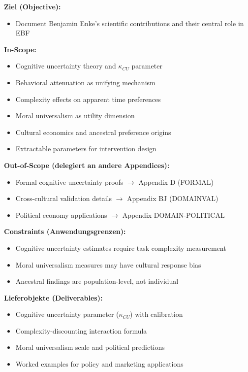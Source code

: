 \begin{tcolorbox}[
    colback=orange!5!white,
    colframe=orange!75!black,
    title={\textbf{Appendix Scope: Ziel / In-Scope / Out-of-Scope / Constraints}},
    fonttitle=\bfseries
]

\textbf{Ziel (Objective):}
\begin{itemize}[nosep]
    \item Document Benjamin Enke's scientific contributions and their central role in EBF
\end{itemize}

\textbf{In-Scope:}
\begin{itemize}[nosep]
    \item Cognitive uncertainty theory and $\kappa_{CU}$ parameter
    \item Behavioral attenuation as unifying mechanism
    \item Complexity effects on apparent time preferences
    \item Moral universalism as utility dimension
    \item Cultural economics and ancestral preference origins
    \item Extractable parameters for intervention design
\end{itemize}

\textbf{Out-of-Scope (delegiert an andere Appendices):}
\begin{itemize}[nosep]
    \item Formal cognitive uncertainty proofs $\rightarrow$ Appendix D (FORMAL)
    \item Cross-cultural validation details $\rightarrow$ Appendix BJ (DOMAINVAL)
    \item Political economy applications $\rightarrow$ Appendix DOMAIN-POLITICAL
\end{itemize}

\textbf{Constraints (Anwendungsgrenzen):}
\begin{itemize}[nosep]
    \item Cognitive uncertainty estimates require task complexity measurement
    \item Moral universalism measures may have cultural response bias
    \item Ancestral findings are population-level, not individual
\end{itemize}

\textbf{Lieferobjekte (Deliverables):}
\begin{itemize}[nosep]
    \item Cognitive uncertainty parameter ($\kappa_{CU}$) with calibration
    \item Complexity-discounting interaction formula
    \item Moral universalism scale and political predictions
    \item Worked examples for policy and marketing applications
\end{itemize}

\end{tcolorbox}


